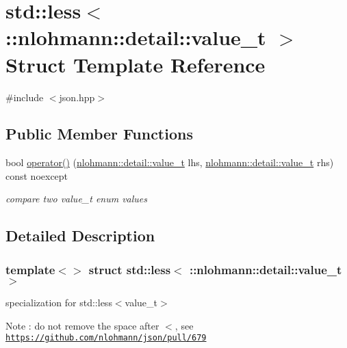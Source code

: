 \hypertarget{structstd_1_1less_3_01_1_1nlohmann_1_1detail_1_1value__t_01_4}{}\section{std\+:\+:less$<$ \+:\+:nlohmann\+:\+:detail\+:\+:value\+\_\+t $>$ Struct Template Reference}
\label{structstd_1_1less_3_01_1_1nlohmann_1_1detail_1_1value__t_01_4}


{\ttfamily \#include $<$json.\+hpp$>$}

\subsection*{Public Member Functions}
\begin{DoxyCompactItemize}
\item 
bool \mbox{\hyperlink{structstd_1_1less_3_01_1_1nlohmann_1_1detail_1_1value__t_01_4_a76d2a6c170cfd74f3b1882be1b5a6671}{operator()}} (\mbox{\hyperlink{namespacenlohmann_1_1detail_a90aa5ef615aa8305e9ea20d8a947980f}{nlohmann\+::detail\+::value\+\_\+t}} lhs, \mbox{\hyperlink{namespacenlohmann_1_1detail_a90aa5ef615aa8305e9ea20d8a947980f}{nlohmann\+::detail\+::value\+\_\+t}} rhs) const noexcept
\begin{DoxyCompactList}\small\item\em compare two value\+\_\+t enum values \end{DoxyCompactList}\end{DoxyCompactItemize}


\subsection{Detailed Description}
\subsubsection*{template$<$$>$\newline
struct std\+::less$<$ \+::nlohmann\+::detail\+::value\+\_\+t $>$}

specialization for std\+::less$<$value\+\_\+t$>$ \begin{DoxyNote}{Note}
\+: do not remove the space after \textquotesingle{}$<$\textquotesingle{}, see \href{https://github.com/nlohmann/json/pull/679}{\tt https\+://github.\+com/nlohmann/json/pull/679} 
\end{DoxyNote}


